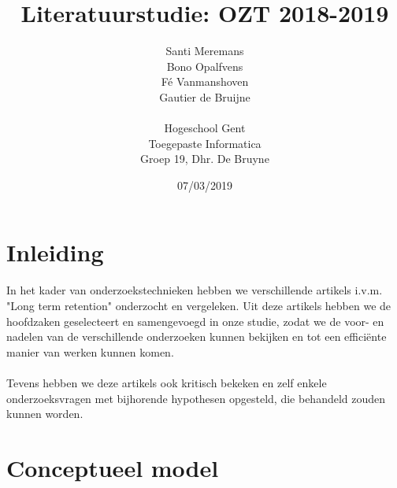 \documentclass{article}
\title{Literatuurstudie: OZT 2018-2019}
\date{07/03/2019}
\author{Santi Meremans \\ Bono Opalfvens \\ Fé Vanmanshoven \\ Gautier de Bruijne \\\\ Hogeschool Gent \\ Toegepaste Informatica \\ Groep 19, Dhr. De Bruyne}
\begin{document}
\maketitle
{}
\newpage

\renewcommand*\contentsname{Inhoudstafel}

\tableofcontents
\newpage

\section{Inleiding}
In het kader van onderzoekstechnieken hebben we verschillende artikels i.v.m. "Long term retention" onderzocht en vergeleken. Uit deze artikels hebben we de hoofdzaken geselecteert en samengevoegd in onze studie, zodat we de voor- en nadelen van de verschillende onderzoeken kunnen bekijken en tot een efficiënte manier van werken kunnen komen.
\\\\
Tevens hebben we deze artikels ook kritisch bekeken en zelf enkele onderzoeksvragen met bijhorende hypothesen opgesteld, die behandeld zouden kunnen worden.

\section{Conceptueel model}
\end{document}
